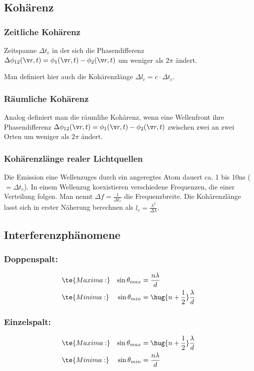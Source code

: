 \documentclass[twocolumn, unnumberedsubsub]{summery}
\begin{document}
\subsection{Kohärenz}
\subsubsection*{Zeitliche Kohärenz}
Zeitspanne \(\Delta t_c\) in der sich die Phasendifferenz 
\(\Delta\phi_{12}(\v r, t) = \phi_1(\v r, t) - \phi _2(\v r, t)\) um weniger als
\(2\pi\) ändert. 

Man definiert hier auch die Kohärenzlänge \(\Delta l_c= c\cdot \Delta t_c\).

\subsubsection*{Räumliche Kohärenz}
Analog definiert man die räumlihe Kohärenz, wenn eine Wellenfront ihre Phasendifferenz
\(\Delta\phi_{12}(\v r, t) = \phi_1(\v r, t) - \phi _2(\v r, t)\) zwischen zwei 
an zwei Orten um weniger als \(2\pi\) ändert.

\subsubsection*{Kohärenzlänge realer Lichtquellen}
Die Emission eine Wellenzuges durch ein angeregtes Atom dauert ca. 1 bis 10ns 
(\(=\Delta t_c\)). In einem Wellenzug koexistieren verschiedene Frequenzen, die einer 
Verteilung folgen. Man nennt \(\Delta f = \frac 1{\Delta t_c}\) die Frequenzbreite.
Die Kohärenzlänge lasst sich in erster Näherung berechnen als 
\(l_c = \frac{\lambda^2}{\Delta \lambda}\).

\subsection{Interferenzphänomene}
\subsubsection{Doppenspalt:}\tight
\begin{align*}
    &\te{Maxima:} & \sin\theta_{max} &= \frac{n\lambda}{d}\\    
    &\te{Minima:} & \sin\theta_{min} &= \hug{n+\frac12}\frac{\lambda}{d}  
\end{align*}

\subsubsection{Einzelspalt:}\tight
\begin{align*}
    &\te{Maxima:} & \sin\theta_{max} &=  \hug{n+\frac12}\frac{\lambda}{d}\\    
    &\te{Minima:} & \sin\theta_{min} &= \frac{n\lambda}{d}    
\end{align*}
\end{document}
